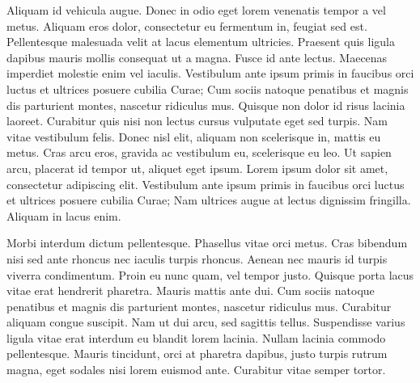 \documentclass[11pt,a4paper]{report}
\begin{document}
Aliquam id vehicula augue. Donec in odio eget lorem venenatis tempor a vel metus. Aliquam eros dolor, consectetur eu fermentum in, feugiat sed est. Pellentesque malesuada velit at lacus elementum ultricies. Praesent quis ligula dapibus mauris mollis consequat ut a magna. Fusce id ante lectus. Maecenas imperdiet molestie enim vel iaculis. Vestibulum ante ipsum primis in faucibus orci luctus et ultrices posuere cubilia Curae; Cum sociis natoque penatibus et magnis dis parturient montes, nascetur ridiculus mus. Quisque non dolor id risus lacinia laoreet. Curabitur quis nisi non lectus cursus vulputate eget sed turpis. Nam vitae vestibulum felis. Donec nisl elit, aliquam non scelerisque in, mattis eu metus. Cras arcu eros, gravida ac vestibulum eu, scelerisque eu leo. Ut sapien arcu, placerat id tempor ut, aliquet eget ipsum. Lorem ipsum dolor sit amet, consectetur adipiscing elit. Vestibulum ante ipsum primis in faucibus orci luctus et ultrices posuere cubilia Curae; Nam ultrices augue at lectus dignissim fringilla. Aliquam in lacus enim.

Morbi interdum dictum pellentesque. Phasellus vitae orci metus. Cras bibendum nisi sed ante rhoncus nec iaculis turpis rhoncus. Aenean nec mauris id turpis viverra condimentum. Proin eu nunc quam, vel tempor justo. Quisque porta lacus vitae erat hendrerit pharetra. Mauris mattis ante dui. Cum sociis natoque penatibus et magnis dis parturient montes, nascetur ridiculus mus. Curabitur aliquam congue suscipit. Nam ut dui arcu, sed sagittis tellus. Suspendisse varius ligula vitae erat interdum eu blandit lorem lacinia. Nullam lacinia commodo pellentesque. Mauris tincidunt, orci at pharetra dapibus, justo turpis rutrum magna, eget sodales nisi lorem euismod ante. Curabitur vitae semper tortor. 
\end{document}
